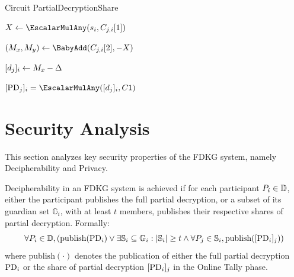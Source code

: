 \documentclass[runningheads]{llncs}
\begin{document}
\begin{algorithm}[H]
\caption{Circuit PartialDecryptionShare}
\label{alg:circuit_proof_pds}


\BlankLine

$X \leftarrow \EscalarMulAny(\PartySecretKey{i}, \EncryptedPartialDecryptionKeyShare{j}{i}[1])$\; %

$(M_x, M_y) \leftarrow \BabyAdd(\EncryptedPartialDecryptionKeyShare{j}{i}[2], - X)$\; %

$[d_{j}]_{i} \leftarrow M_x - \Delta$\;

\Assert $\SharePartialDecryptionFromTo{j}{i} = \EscalarMulAny(\PartialDecryptionKeyShare{j}{i}, \TotalA{})$
\end{algorithm}



\section{Security Analysis}

This section analyzes key security properties of the FDKG system, namely Decipherability and Privacy.

\begin{definition}[Decipherability] \label{def:decipherability}
    Decipherability in an FDKG system is achieved if for each participant $P_{i} \in \mathbb{D}$, either the participant publishes the full partial decryption, or a subset of its guardian set $\mathbb{G}_i$, with at least $t$ members, publishes their respective shares of partial decryption. Formally: 
    \[
    \forall P_{i} \in \mathbb{D}, \left( \textrm{publish}(\mathrm{PD}_{i}) \lor \exists \mathbb{S}_i \subseteq \mathbb{G}_i : |\mathbb{S}_i| \geq t \land \forall P_{j} \in \mathbb{S}_i, \textrm{publish}([\mathrm{PD}_{i}]_{j}) \right)
    \]
    where \(\textrm{publish}(\cdot)\) denotes the publication of either the full partial decryption $\mathrm{PD}_{i}$ or the share of partial decryption $[\mathrm{PD}_{i}]_{j}$ in the Online Tally phase.
\end{definition}
\end{document}
